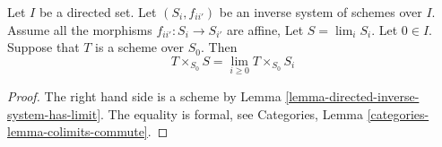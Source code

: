 \begin{lemma}
\label{lemma-scheme-over-limit}
Let $I$ be a directed set.
Let $(S_i, f_{ii'})$ be an inverse system of schemes over $I$.
Assume all the morphisms $f_{ii'} : S_i \to S_{i'}$ are affine,
Let $S = \lim_i S_i$. Let $0 \in I$.
Suppose that $T$ is a scheme over $S_0$.
Then
$$
T \times_{S_0} S = \lim_{i \geq 0} T \times_{S_0} S_i
$$
\end{lemma}

\begin{proof}
The right hand side is a scheme by
Lemma \ref{lemma-directed-inverse-system-has-limit}.
The equality is formal, see
Categories, Lemma \ref{categories-lemma-colimits-commute}.
\end{proof}
